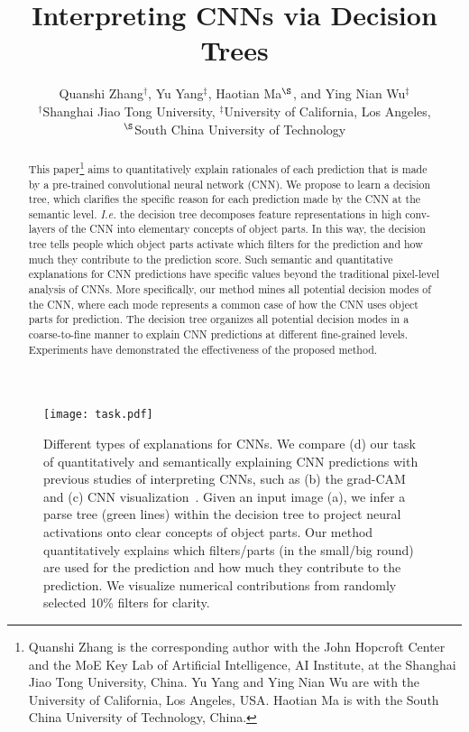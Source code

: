 \documentclass[10pt,twocolumn,letterpaper]{article}
\begin{document}
\title{Interpreting CNNs via Decision Trees}

\author{Quanshi Zhang$^{\dag}$, Yu Yang$^{\ddag}$, Haotian Ma$^{\S}$, and Ying Nian Wu$^{\ddag}$\\
$^{\dag}$Shanghai Jiao Tong University, \quad$^{\ddag}$University of California, Los Angeles,\\$^{\S}$South China University of Technology
}

\maketitle

\begin{abstract}
This paper\footnote[1]{Quanshi Zhang is the corresponding author with the John Hopcroft Center and the MoE Key Lab of Artificial Intelligence, AI Institute, at the Shanghai Jiao Tong University, China. Yu Yang and Ying Nian Wu are with the University of California, Los Angeles, USA. Haotian Ma is with the South China University of Technology, China.} aims to quantitatively explain rationales of each prediction that is made by a pre-trained convolutional neural network (CNN). We propose to learn a decision tree, which clarifies the specific reason for each prediction made by the CNN at the semantic level. \emph{I.e.} the decision tree decomposes feature representations in high conv-layers of the CNN into elementary concepts of object parts. In this way, the decision tree tells people which object parts activate which filters for the prediction and how much they contribute to the prediction score. Such semantic and quantitative explanations for CNN predictions have specific values beyond the traditional pixel-level analysis of CNNs. More specifically, our method mines all potential decision modes of the CNN, where each mode represents a common case of how the CNN uses object parts for prediction. The decision tree organizes all potential decision modes in a coarse-to-fine manner to explain CNN predictions at different fine-grained levels. Experiments have demonstrated the effectiveness of the proposed method.
\end{abstract}

\begin{figure}[t]
\centering
\texttt{[image: task.pdf]}
\caption{Different types of explanations for CNNs. We compare (d) our task of quantitatively and semantically explaining CNN predictions with previous studies of interpreting CNNs, such as (b) the grad-CAM~\cite{visualCNN_grad_2} and (c) CNN visualization~\cite{CNNVisualization_2}. Given an input image (a), we infer a parse tree (green lines) within the decision tree to project neural activations onto clear concepts of object parts. Our method quantitatively explains which filters/parts (in the small/big round) are used for the prediction and how much they contribute to the prediction. We visualize numerical contributions from randomly selected 10\% filters for clarity.}
\label{fig:task}
\end{figure}
\end{document}
